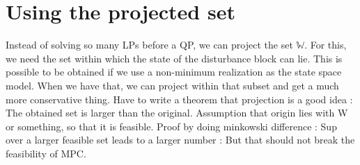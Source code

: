 \documentclass[letterpaper, 10 pt, conference]{ieeeconf}  %
\begin{document}
\section{Using the projected set}
Instead of solving so many LPs before a QP, we can project the set $\mathbb{W}$. For this, we need the set within which the state of the disturbance block can lie. This is possible to be obtained if we use a non-minimum realization as the state space model. When we have that, we can project within that subset and get a much more conservative thing. 
Have to write a theorem that projection is a good idea : The obtained set is larger than the original. Assumption that origin lies with W or something, so that it is feasible. Proof by doing minkowski difference : Sup over a larger feasible set leads to a larger number : But that should not break the feasibility of MPC.
    

\end{document}
